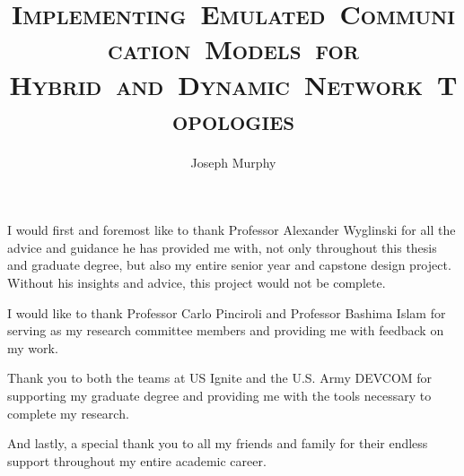 \documentclass[11pt]{mvlthesis}
\title{\scshape \mbox{Implementing Emulated Communication Models for}\\
\scshape \mbox{Hybrid and Dynamic Network Topologies}}
\author{Joseph Murphy}
\begin{document}
\maketitle
\begin{abstract}



\end{abstract}

\begin{frontmatter}
\begin{acknowledgements}
\begin{center}
\vspace{0.4in}
I would first and foremost like to thank Professor Alexander Wyglinski for all the advice and guidance he has provided me with, not only throughout this thesis and graduate degree, but also my entire senior year and capstone design project. Without his insights and advice, this project would not be complete.\par
I would like to thank Professor Carlo Pinciroli and Professor Bashima Islam for serving as my research committee members and providing me with feedback on my work.\par
Thank you to both the teams at US Ignite and the U.S. Army DEVCOM for supporting my graduate degree and providing me with the tools necessary to complete my research.\par
And lastly, a special thank you to all my friends and family for their endless support throughout my entire academic career.
\end{center}
\end{acknowledgements}

\tableofcontents
\listoffigures
\listoftables

\end{frontmatter}











\appendix
\end{document}
